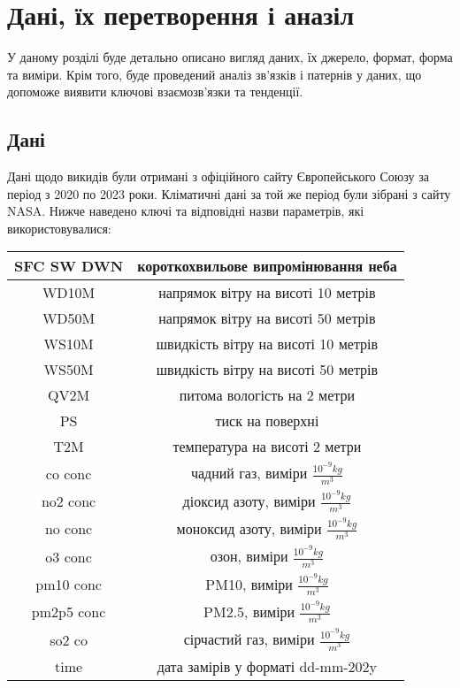 \chapter{Дані, їх перетворення і аназіл}

У даному розділі буде детально описано вигляд даних, їх джерело, формат, форма та виміри. 
Крім того, буде проведений аналіз зв’язків і патернів у даних, що допоможе виявити ключові взаємозв'язки та тенденції.


\section{Дані}

Дані щодо викидів були отримані з офіційного сайту Європейського Союзу за період з 2020 по 2023 роки. 
Кліматичні дані за той же період були зібрані з сайту NASA. Нижче наведено ключі та відповідні назви параметрів, які використовувалися:

\begin{center}
    \begin{tabular}{|c | c|}
        \hline
        SFC SW DWN & короткохвильове випромінювання неба \\
        \hline
        WD10M & напрямок вітру на висоті 10 метрів \\ 
        \hline
        WD50M & напрямок вітру на висоті 50 метрів \\
        \hline
        WS10M & швидкість вітру на висоті 10 метрів \\
        \hline
        WS50M & швидкість вітру на висоті 50 метрів  \\
        \hline
        QV2M & питома вологість на 2 метри \\
        \hline
        PS & тиск на поверхні \\
        \hline
        T2M & температура на висоті 2 метри \\
        \hline
        co conc & чадний газ, виміри $\frac{10^{-9}kg}{m^{3}}$ \\
        \hline
        no2 conc & діоксид азоту, виміри $\frac{10^{-9}kg}{m^{3}}$ \\
        \hline
        no conc & моноксид азоту, виміри $\frac{10^{-9}kg}{m^{3}}$ \\
        \hline
        o3 conc & озон, виміри $\frac{10^{-9}kg}{m^{3}}$  \\
        \hline
        pm10 conc & PM10, виміри $\frac{10^{-9}kg}{m^{3}}$ \\
        \hline
        pm2p5 conc & PM2.5, виміри $\frac{10^{-9}kg}{m^{3}}$ \\
        \hline
        so2 co & сірчастий газ, виміри $\frac{10^{-9}kg}{m^{3}}$ \\
        \hline
        time & дата замірів у форматі dd-mm-202y \\
        \hline
    \end{tabular}
    
    \vspace{1cm}
\end{center}


